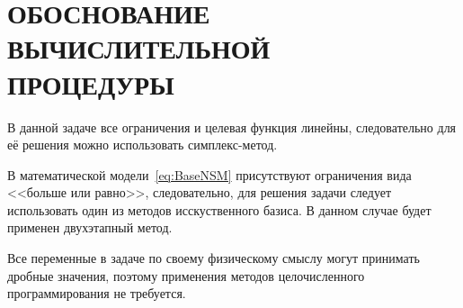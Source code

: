 \section[Обоснование вычислительной процедуры]{ОБОСНОВАНИЕ ВЫЧИСЛИТЕЛЬНОЙ \\ ПРОЦЕДУРЫ}

В данной задаче все ограничения и целевая функция линейны,
следовательно для её решения можно использовать симплекс-метод.

В математической модели~\eqref{eq:BaseNSM} присутствуют ограничения вида
<<больше или равно>>, следовательно, для решения задачи следует использовать 
один из методов исскуственного базиса. В данном случае будет применен двухэтапный метод.

Все переменные в задаче по своему физическому смыслу могут принимать
дробные значения, поэтому применения методов целочисленного программирования
не требуется.

\pagebreak